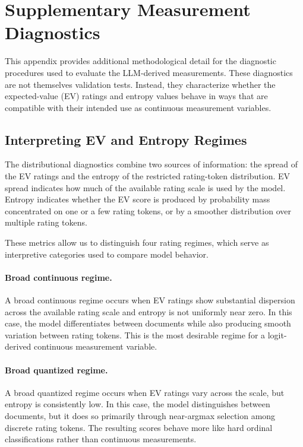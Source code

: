 \section{Supplementary Measurement Diagnostics}
\label{app:measurement_diagnostics}

This appendix provides additional methodological detail for the diagnostic procedures used to evaluate the LLM-derived measurements. These diagnostics are not themselves validation tests. Instead, they characterize whether the expected-value (EV) ratings and entropy values behave in ways that are compatible with their intended use as continuous measurement variables.

\subsection{Interpreting EV and Entropy Regimes}
\label{app:rating_regimes}

The distributional diagnostics combine two sources of information: the spread of the EV ratings and the entropy of the restricted rating-token distribution. EV spread indicates how much of the available rating scale is used by the model. Entropy indicates whether the EV score is produced by probability mass concentrated on one or a few rating tokens, or by a smoother distribution over multiple rating tokens.

These metrics allow us to distinguish four rating regimes, which serve as interpretive categories used to compare model behavior.

\paragraph{Broad continuous regime.}
A broad continuous regime occurs when EV ratings show substantial dispersion across the available rating scale and entropy is not uniformly near zero. In this case, the model differentiates between documents while also producing smooth variation between rating tokens. This is the most desirable regime for a logit-derived continuous measurement variable.

\paragraph{Broad quantized regime.}
A broad quantized regime occurs when EV ratings vary across the scale, but entropy is consistently low. In this case, the model distinguishes between documents, but it does so primarily through near-argmax selection among discrete rating tokens. The resulting scores behave more like hard ordinal classifications rather than continuous measurements.

